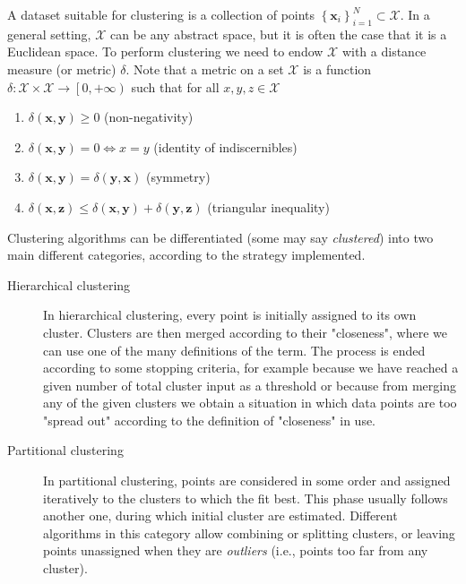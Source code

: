 \documentclass[a4paper]{article}
\begin{document}
	A dataset suitable for clustering is a collection of points $\left\{ \boldsymbol{x}_{i} \right\}_{i=1}^{N} \subset \mathcal{X}$. In a general setting, $\mathcal{X}$ can be any abstract space, but it is often the case that it is a Euclidean space. To perform clustering we need to endow $\mathcal{X}$ with a distance measure (or metric) $\delta$. Note that a metric on a set $\mathcal{X}$ is a function $\delta : \mathcal{X} \times \mathcal{X} \to \left[0,+\infty\right)$ such that for all $x, y, z \in \mathcal{X}$
	\begin{enumerate}
	\item $\delta \left( \boldsymbol{x}, \boldsymbol{y} \right)\geq 0$ (non-negativity)
	\item $\delta \left( \boldsymbol{x}, \boldsymbol{y} \right) = 0 \iff x = y$ (identity of indiscernibles)
	\item $\delta \left( \boldsymbol{x}, \boldsymbol{y} \right) = \delta \left( \boldsymbol{y}, \boldsymbol{x} \right) $ (symmetry)
	\item $ \delta \left( \boldsymbol{x}, \boldsymbol{z} \right) \leq \delta \left( \boldsymbol{x}, \boldsymbol{y} \right) + \delta \left( \boldsymbol{y}, \boldsymbol{z} \right) $ (triangular inequality)
	\end{enumerate}
	Clustering algorithms can be differentiated (some may say \textit{clustered}) into two main different categories, according to the strategy implemented.
	\begin{description}
		\item[Hierarchical clustering] In hierarchical clustering, every point is initially assigned to its own cluster. Clusters are then merged according to their "closeness", where we can use one of the many definitions of the term. The process is ended according to some stopping criteria, for example because we have reached a given number of total cluster input as a threshold or because from merging any of the given clusters we obtain a situation in which data points are too "spread out" according to the definition of "closeness" in use.
		\item[Partitional clustering] In partitional clustering, points are considered in some order and assigned iteratively to the clusters to which the fit best. This phase usually follows another one, during which initial cluster are estimated. Different algorithms in this category allow combining or splitting clusters, or leaving points unassigned when they are \textit{outliers} (i.e., points too far from any cluster).
	\end{description}
	
\end{document}
